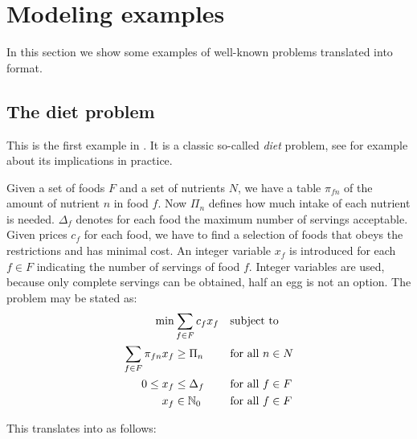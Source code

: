 \clearpage
\section{Modeling examples}\label{modelingexamples}
In this section we show some examples of well-known problems
translated into \zimpl format.

\subsection{The diet problem}
This is the first example in
\cite[Chapter 1, page 3]{Chvatal1983}.
It is a classic so-called \emph{diet} problem, see for example
\cite{Dantzig1990} about its implications in practice.

Given a set of foods $F$ and a set of nutrients $N$, we have a table
$\pi_{fn}$ of the amount of nutrient $n$ in food $f$. Now $\Pi_n$
defines how much intake of each nutrient is needed. $\Delta_f$
denotes for each food the maximum number of servings acceptable.
Given prices $c_f$ for each food, we have to find a selection of foods
that obeys the restrictions and has minimal cost. An integer
variable $x_f$ is introduced for each $f\in F$ indicating the number of servings of
food $f$. Integer variables are used, because only complete servings can be
obtained, \ie half an egg is not an option.
The problem may be stated as:
\begin{align*}
\min&\sum_{f\in F}c_{f} x_{f}&&\mbox{subject to}\nonumber\\
\sum_{f\in F} \pi_{fn} x_{f}&\ge\Pi_n&&\text{for all } n\in N\nonumber\\
0\leq x_{f}&\leq\Delta_f&&\text{for all } f\in F\nonumber\\
x_{f}&\in\mathbb{N}_0&&\text{for all } f\in F
\end{align*}

\noindent This translates into \zimpl as follows:

